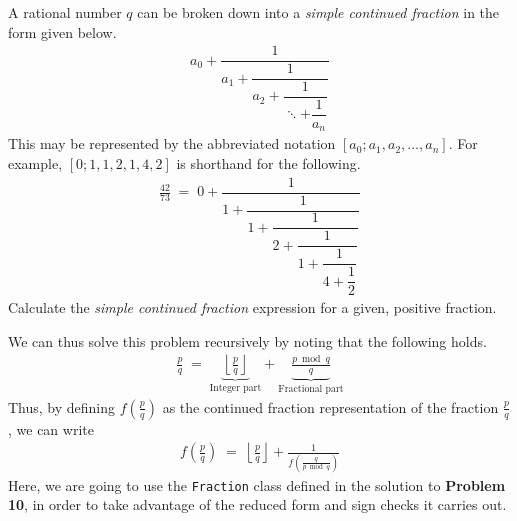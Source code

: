 

\problem A rational number $q$ can be broken down into a \textit{simple continued fraction} in the form given below.
\begin{align*}
	a_0 + \dfrac{1}{a_1 + \dfrac{1}{a_2 + \dfrac{1}{\ddots + \dfrac{1}{a_n}}}}
\end{align*}
This may be represented by the abbreviated notation $[a_0; a_1, a_2, \dots, a_n]$. For example, $[0; 1, 1, 2, 1, 4, 2]$ is shorthand for the following.
\begin{align*}
	\frac{42}{73} \;=\; 0 + \dfrac{1}{1 + \dfrac{1}{1 + \dfrac{1}{2 + \dfrac{1}{1 + \dfrac{1}{4 + \dfrac{1}{2}}}}}}
\end{align*}
Calculate the \textit{simple continued fraction} expression for a given, positive fraction.

\solution
We can thus solve this problem recursively by noting that the following holds.
\begin{align*}
	\frac{p}{q} \;=\;\!\!\! \underbrace{\left\lfloor \frac{p}{q} \right\rfloor}_{\text{Integer part}} 
			\!\!\!	+ \underbrace{\frac{p \bmod q}{q}}_{\text{Fractional part}}
\end{align*}
Thus, by defining $f(\frac{p}{q})$ as the continued fraction representation of the fraction $\frac{p}{q}$, we can write
\begin{align*}
	f \left( \frac{p}{q} \right) \;=\; \left\lfloor \frac{p}{q} \right\rfloor + \frac{1}{f \left( \frac{q}{p \bmod q} \right)}
\end{align*}
Here, we are going to use the \texttt{Fraction} class defined in the solution to \textbf{Problem 10}, in order to take advantage of the
reduced form and sign checks it carries out.


